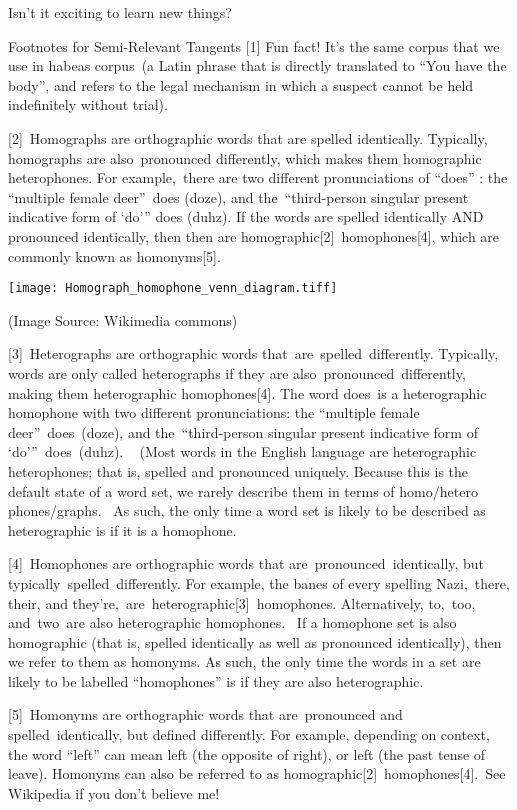Isn't it exciting to learn new things?

Footnotes for Semi-Relevant Tangents
[1] Fun fact! It's the same corpus that we use in habeas corpus (a Latin phrase that is directly translated to ``You have the body'', and refers to the legal mechanism in which a suspect cannot be held indefinitely without trial).

[2] Homographs are orthographic words that are spelled identically. Typically, homographs are also pronounced differently, which makes them homographic heterophones. For example, there are two different pronunciations of ``does'' : the ``multiple female deer'' does (doze), and the ``third-person singular present indicative form of `do''' does (duhz). If the words are spelled identically AND pronounced identically, then then are homographic[2] homophones[4], which are commonly known as homonyms[5].

\texttt{[image: Homograph\_homophone\_venn\_diagram.tiff]}

(Image Source: Wikimedia commons)

[3] Heterographs are orthographic words that are spelled differently. Typically, words are only called heterographs if they are also pronounced differently, making them heterographic homophones[4]. The word does is a heterographic homophone with two different pronunciations: the ``multiple female deer'' does (doze), and the ``third-person singular present indicative form of `do''' does (duhz).   (Most words in the English language are heterographic heterophones; that is, spelled and pronounced uniquely. Because this is the default state of a word set, we rarely describe them in terms of homo\slash hetero phones\slash graphs.  As such, the only time a word set is likely to be described as heterographic is if it is a homophone. 

[4] Homophones are orthographic words that are pronounced identically, but typically spelled differently. For example, the banes of every spelling Nazi, there, their, and they're, are heterographic[3] homophones. Alternatively, to, too, and two are also heterographic homophones.  If a homophone set is also homographic (that is, spelled identically as well as pronounced identically), then we refer to them as homonyms. As such, the only time the words in a set are likely to be labelled ``homophones'' is if they are also heterographic.

[5] Homonyms are orthographic words that are pronounced and spelled identically, but defined differently. For example, depending on context, the word ``left'' can mean left (the opposite of right), or left (the past tense of leave). Homonyms can also be referred to as homographic[2] homophones[4]. See Wikipedia if you don't believe me!




